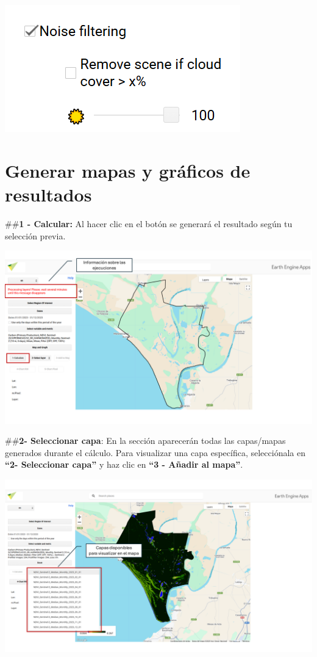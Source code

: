 \documentclass[
]{book}
\begin{document}
\includegraphics{assets/filter.png}

\chapter{Generar mapas y gráficos de resultados}\label{mapas-graficos}

\#\#\textbf{1 - Calcular:} Al hacer clic en el botón se generará el resultado según tu selección previa.

\includegraphics{assets/message_es.png}

\#\#\textbf{2- Seleccionar capa}: En la sección aparecerán todas las capas/mapas generados durante el cálculo. Para visualizar una capa específica, selecciónala en \textbf{``2- Seleccionar capa''} y haz clic en \textbf{``3 - Añadir al mapa''}.

\includegraphics{assets/layers_es.png}
\end{document}
